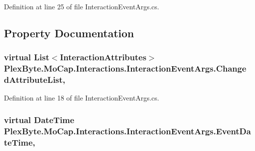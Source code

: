 Definition at line 25 of file Interaction\+Event\+Args.\+cs.



\subsection{Property Documentation}
\subsubsection[{\texorpdfstring{Changed\+Attribute\+List}{ChangedAttributeList}}]{\setlength{\rightskip}{0pt plus 5cm}virtual List$<${\bf Interaction\+Attributes}$>$ Plex\+Byte.\+Mo\+Cap.\+Interactions.\+Interaction\+Event\+Args.\+Changed\+Attribute\+List\hspace{0.3cm}{\ttfamily [get]}, {\ttfamily [set]}}\hypertarget{class_plex_byte_1_1_mo_cap_1_1_interactions_1_1_interaction_event_args_a3ecc8573a86ce5c0f2600ddff24d992e}{}\label{class_plex_byte_1_1_mo_cap_1_1_interactions_1_1_interaction_event_args_a3ecc8573a86ce5c0f2600ddff24d992e}


Definition at line 18 of file Interaction\+Event\+Args.\+cs.

\subsubsection[{\texorpdfstring{Event\+Date\+Time}{EventDateTime}}]{\setlength{\rightskip}{0pt plus 5cm}virtual Date\+Time Plex\+Byte.\+Mo\+Cap.\+Interactions.\+Interaction\+Event\+Args.\+Event\+Date\+Time\hspace{0.3cm}{\ttfamily [get]}, {\ttfamily [set]}}\hypertarget{class_plex_byte_1_1_mo_cap_1_1_interactions_1_1_interaction_event_args_a371473e88cd5dcfc31b103bedac6470e}{}\label{class_plex_byte_1_1_mo_cap_1_1_interactions_1_1_interaction_event_args_a371473e88cd5dcfc31b103bedac6470e}


